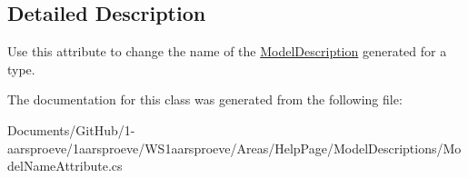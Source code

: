 \subsection{Detailed Description}
Use this attribute to change the name of the \hyperlink{class_w_s1aarsproeve_1_1_areas_1_1_help_page_1_1_model_descriptions_1_1_model_description}{Model\+Description} generated for a type. 



The documentation for this class was generated from the following file\+:\begin{DoxyCompactItemize}
\item 
Documents/\+Git\+Hub/1-\/aarsproeve/1aarsproeve/\+W\+S1aarsproeve/\+Areas/\+Help\+Page/\+Model\+Descriptions/Model\+Name\+Attribute.\+cs\end{DoxyCompactItemize}
